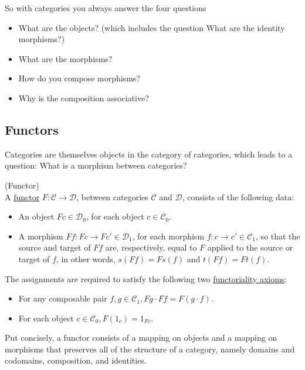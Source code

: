 \noindent So with categories you always answer the four questions
\begin{itemize}\label{category_questions}
\item What are the objects? (which includes the question What are the identity morphisms?)
\item What are the morphisms?
\item How do you compose morphisms?
\item Why is the composition associative?
\end{itemize}

\subsection{Functors}

Categories are themselves objects in the category of categories, which leads to a question: What is a morphism between categories?

\begin{definition}{(Functor)}\label{def:functor}\\
\noindent A \ul{functor} $F : \mathcal{C} \rightarrow \mathcal{D}$, between categories $\mathcal{C}$ and $\mathcal{D}$, consists of the
following data:

\begin{itemize}
\item An object $Fc\in\mathcal{D}_{0}$, for each object $c \in \mathcal{C}_{0}$.
\item A morphism $Ff : Fc \rightarrow Fc' \in \mathcal{D}_{1}$, for each morphism $f : c \rightarrow c' \in \mathcal{C}_{1}$, so that the
source and target of $Ff$ are, respectively, equal to $F$ applied to the source or target of $f$, in other words,
$s(Ff) = Fs(f)$ and $t(Ff) = Ft(f)$.
\end{itemize}

\noindent The assignments are required to satisfy the following two \ul{functoriality axioms}:
\begin{itemize}\label{functoriality}
\item For any composable pair $f, g \in \mathcal{C}_{1}, Fg \cdot Ff = F(g \cdot f)$.
\item For each object $c \in \mathcal{C}_{0}, F(1_{c}) = 1_{Fc}$.
\end{itemize}

Put concisely, a functor consists of a mapping on objects and a mapping on morphisms that preserves all of the structure of a category,
namely domains and codomains, composition, and identities.
\end{definition}

